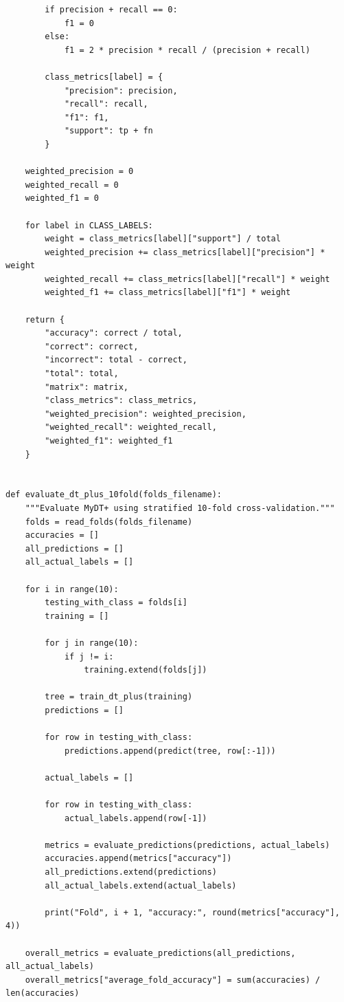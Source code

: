 \documentclass[12pt,a4paper]{article}
\begin{document}
{\begin{verbatim}
        if precision + recall == 0:
            f1 = 0
        else:
            f1 = 2 * precision * recall / (precision + recall)

        class_metrics[label] = {
            "precision": precision,
            "recall": recall,
            "f1": f1,
            "support": tp + fn
        }

    weighted_precision = 0
    weighted_recall = 0
    weighted_f1 = 0

    for label in CLASS_LABELS:
        weight = class_metrics[label]["support"] / total
        weighted_precision += class_metrics[label]["precision"] * weight
        weighted_recall += class_metrics[label]["recall"] * weight
        weighted_f1 += class_metrics[label]["f1"] * weight

    return {
        "accuracy": correct / total,
        "correct": correct,
        "incorrect": total - correct,
        "total": total,
        "matrix": matrix,
        "class_metrics": class_metrics,
        "weighted_precision": weighted_precision,
        "weighted_recall": weighted_recall,
        "weighted_f1": weighted_f1
    }


def evaluate_dt_plus_10fold(folds_filename):
    """Evaluate MyDT+ using stratified 10-fold cross-validation."""
    folds = read_folds(folds_filename)
    accuracies = []
    all_predictions = []
    all_actual_labels = []

    for i in range(10):
        testing_with_class = folds[i]
        training = []

        for j in range(10):
            if j != i:
                training.extend(folds[j])

        tree = train_dt_plus(training)
        predictions = []

        for row in testing_with_class:
            predictions.append(predict(tree, row[:-1]))

        actual_labels = []

        for row in testing_with_class:
            actual_labels.append(row[-1])

        metrics = evaluate_predictions(predictions, actual_labels)
        accuracies.append(metrics["accuracy"])
        all_predictions.extend(predictions)
        all_actual_labels.extend(actual_labels)

        print("Fold", i + 1, "accuracy:", round(metrics["accuracy"], 4))

    overall_metrics = evaluate_predictions(all_predictions, all_actual_labels)
    overall_metrics["average_fold_accuracy"] = sum(accuracies) / len(accuracies)


\end{verbatim}}
\end{document}

